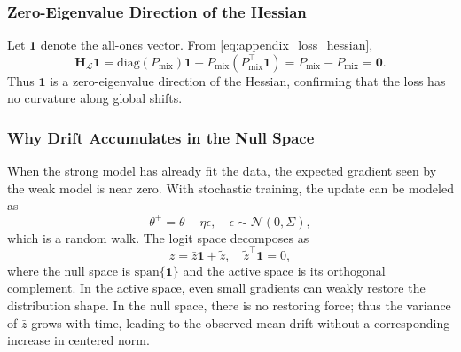 \subsubsection{Zero-Eigenvalue Direction of the Hessian}
Let $\mathbf{1}$ denote the all-ones vector. From \eqref{eq:appendix_loss_hessian},
\begin{equation}
    \mathbf{H}_{\mathcal{L}}\mathbf{1}
    = \text{diag}(P_{\mathrm{mix}})\mathbf{1} - P_{\mathrm{mix}}(P_{\mathrm{mix}}^\top \mathbf{1})
    = P_{\mathrm{mix}} - P_{\mathrm{mix}} = \mathbf{0}.
    \label{eq:appendix_null_direction}
\end{equation}
Thus $\mathbf{1}$ is a zero-eigenvalue direction of the Hessian, confirming that the loss has no curvature along global shifts.

\subsubsection{Why Drift Accumulates in the Null Space}
When the strong model has already fit the data, the expected gradient seen by the weak model is near zero. With stochastic training, the update can be modeled as
\begin{equation}
    \theta^{+} = \theta - \eta \epsilon, \quad \epsilon \sim \mathcal{N}(0,\Sigma),
    \label{eq:appendix_sgd_stochasticity}
\end{equation}
which is a random walk. The logit space decomposes as
\begin{equation}
    z = \bar{z} \mathbf{1} + \tilde{z}, \quad
    \tilde{z}^\top \mathbf{1} = 0,
    \label{eq:appendix_decompose}
\end{equation}
where the null space is $\mathrm{span}\{\mathbf{1}\}$ and the active space is its orthogonal complement. In the active space, even small gradients can weakly restore the distribution shape. In the null space, there is no restoring force; thus the variance of $\bar{z}$ grows with time, leading to the observed mean drift without a corresponding increase in centered norm.

